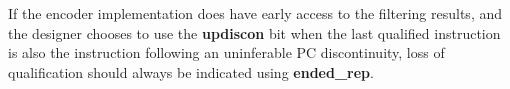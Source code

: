 If the encoder implementation does have early access to the filtering results, and the designer chooses to use the
\textbf{updiscon} bit when the last qualified instruction is also the instruction following an uninferable PC discontinuity,
loss of qualification should always be indicated using \textbf{ended\_rep}.
